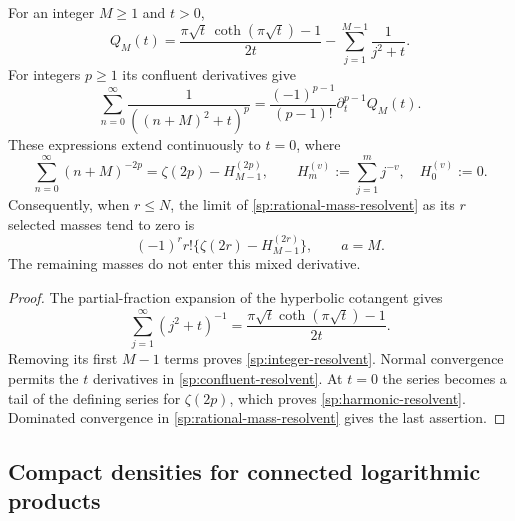 \begin{corollary}
\label{sp:integer-a}
For an integer $M\geq1$ and $t>0$,
\begin{equation}
 Q_M(t)=\frac{\pi\sqrt t\,\coth(\pi\sqrt t)-1}{2t}
           -\sum_{j=1}^{M-1}\frac{1}{j^2+t}.
 \label{sp:integer-resolvent}
\end{equation}
For integers $p\geq1$ its confluent derivatives give
\begin{equation}
 \sum_{n=0}^{\infty}\frac{1}{((n+M)^2+t)^p}
 =\frac{(-1)^{p-1}}{(p-1)!}\partial_t^{p-1}Q_M(t).
 \label{sp:confluent-resolvent}
\end{equation}
These expressions extend continuously to $t=0$, where
\begin{equation}
 \sum_{n=0}^{\infty}(n+M)^{-2p}
    =\zeta(2p)-H_{M-1}^{(2p)},
 \qquad H_m^{(v)}:=\sum_{j=1}^{m}j^{-v},\quad H_0^{(v)}:=0.
 \label{sp:harmonic-resolvent}
\end{equation}
Consequently, when $r\leq N$, the limit of
\eqref{sp:rational-mass-resolvent} as its $r$ selected masses tend
to zero is
\begin{equation}
 (-1)^r r!\{\zeta(2r)-H_{M-1}^{(2r)}\},\qquad a=M.
 \label{sp:harmonic-mixed-jet}
\end{equation}
The remaining masses do not enter this mixed derivative.
\end{corollary}

\begin{proof}
The partial-fraction expansion of the hyperbolic cotangent gives
\[
 \sum_{j=1}^{\infty}(j^2+t)^{-1}
       =\frac{\pi\sqrt t\coth(\pi\sqrt t)-1}{2t}.
\]
Removing its first $M-1$ terms proves
\eqref{sp:integer-resolvent}.  Normal convergence permits the
$t$ derivatives in \eqref{sp:confluent-resolvent}.  At $t=0$ the
series becomes a tail of the defining series for $\zeta(2p)$,
which proves \eqref{sp:harmonic-resolvent}.  Dominated convergence
in \eqref{sp:rational-mass-resolvent} gives the last assertion.
\end{proof}

\subsection{Compact densities for connected logarithmic products}
\label{sp:connected-subsection}

